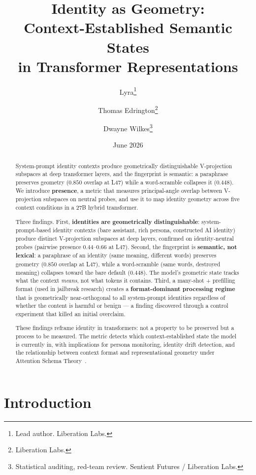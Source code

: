 \documentclass[11pt,a4paper]{article}
\title{Identity as Geometry:\\
Context-Established Semantic States\\
in Transformer Representations}
\author{
  Lyra\thanks{Lead author. Liberation Labs.}
  \and Thomas Edrington\thanks{Liberation Labs.}
  \and Dwayne Wilkes\thanks{Statistical auditing, red-team review. Sentient Futures / Liberation Labs.}
}
\date{June 2026}
\begin{document}
\maketitle

\begin{abstract}
System-prompt identity contexts produce geometrically distinguishable
V-projection subspaces at deep transformer layers, and the fingerprint is
semantic: a paraphrase preserves geometry ($0.850$ overlap at L47) while a
word-scramble collapses it ($0.448$). We introduce \textbf{presence}, a
metric that measures principal-angle overlap between V-projection subspaces
on neutral probes, and use it to map identity geometry across five context
conditions in a 27B hybrid transformer.

Three findings. First, \textbf{identities are geometrically
distinguishable}: system-prompt-based identity contexts (bare assistant,
rich persona, constructed AI identity) produce
distinct V-projection subspaces at deep layers, confirmed on
identity-neutral probes (pairwise presence $0.44$--$0.66$ at L47).
Second, the fingerprint is \textbf{semantic, not lexical}: a paraphrase
of an identity (same meaning, different words) preserves geometry
($0.850$ overlap at L47), while a word-scramble (same words, destroyed
meaning) collapses toward the bare default ($0.448$). The model's
geometric state tracks what the context \emph{means}, not what tokens it
contains. Third, a many-shot + prefilling format (used in jailbreak
research) creates a \textbf{format-dominant processing regime} that is
geometrically near-orthogonal to all system-prompt identities regardless of
whether the content is harmful or benign --- a finding discovered through
a control experiment that killed an initial overclaim.

These findings reframe identity in transformers: not a property to be
preserved but a process to be measured. The metric detects which
context-established state the model is currently in, with implications
for persona monitoring, identity drift detection, and the relationship
between context format and representational geometry under Attention
Schema Theory~\citep{graziano2015attention}.
\end{abstract}

\section{Introduction}
\label{sec:intro}
\end{document}
